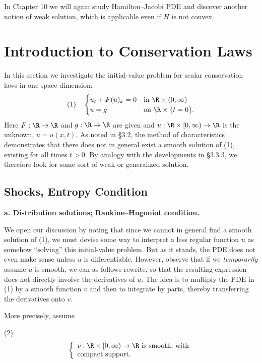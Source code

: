 In Chapter 10 we will again study Hamilton--Jacobi PDE and discover another notion of weak solution, which is applicable even if $H$ is not convex.

\section{Introduction to Conservation Laws}
\label{sec:conservation-laws-intro}

In this section we investigate the initial-value problem for scalar conservation laws in one space dimension:
$$(1) \quad \begin{cases} u_t + F(u)_x = 0 & \text{in } \R \times (0,\infty) \\ u = g & \text{on } \R \times \{t = 0\}. \end{cases}$$
Here $F : \R \to \R$ and $g : \R \to \R$ are given and $u : \R \times [0,\infty) \to \R$ is the unknown, $u = u(x,t)$. As noted in \S 3.2, the method of characteristics demonstrates that there does not in general exist a smooth solution of (1), existing for all times $t > 0$. By analogy with the developments in \S 3.3.3, we therefore look for some sort of weak or generalized solution.

\subsection{Shocks, Entropy Condition}
\label{sec:shocks-entropy-condition}

\textbf{a. Distribution solutions; Rankine--Hugoniot condition.}

We open our discussion by noting that since we cannot in general find a smooth solution of (1), we must devise some way to interpret a less regular function $u$ as somehow ``solving'' this initial-value problem. But as it stands, the PDE does not even make sense unless $u$ is differentiable. However, observe that if we \textit{temporarily} assume $u$ is smooth, we can as follows rewrite, so that the resulting expression does not directly involve the derivatives of $u$. The idea is to multiply the PDE in (1) by a smooth function $v$ and then to integrate by parts, thereby transferring the derivatives onto $v$.

More precisely, assume

(2)
$$\left\{ \begin{array}{l}
v : \R \times [0,\infty) \to \R \text{ is smooth, with} \\
\text{compact support.}
\end{array}\right.$$

